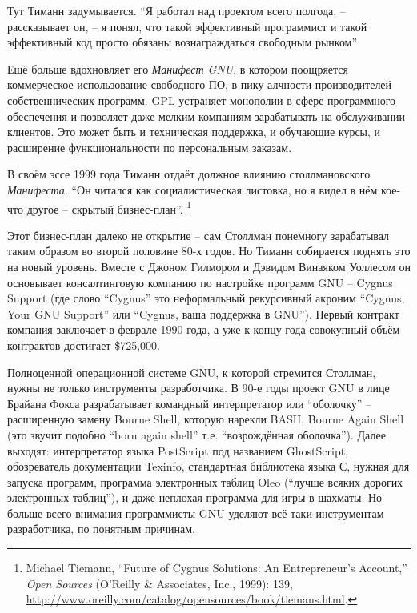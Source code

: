 Тут Тиманн задумывается. \enquote{Я работал над проектом всего полгода, -- рассказывает он, -- я понял, что такой эффективный программист и такой эффективный код просто обязаны вознаграждаться свободным рынком}

Ещё больше вдохновляет его \textit{Манифест GNU}, в котором поощряется коммерческое использование свободного ПО, в пику алчности производителей собственнических программ. GPL устраняет монополии в сфере программного обеспечения и позволяет даже мелким компаниям зарабатывать на обслуживании клиентов. Это может быть и техническая поддержка, и обучающие курсы, и расширение функциональности по персональным заказам.

В своём эссе 1999 года Тиманн отдаёт должное влиянию столлмановского \textit{Манифеста}. \enquote{Он читался как социалистическая листовка, но я видел в нём кое-что другое -- скрытый бизнес-план}. \footnote{Michael Tiemann, \enquote{Future of Cygnus Solutions: An Entrepreneur's Account,} \textit{Open Sources} (O'Reilly \& Associates, Inc., 1999): 139, \url{http://www.oreilly.com/catalog/opensources/book/tiemans.html}.}

Этот бизнес-план далеко не открытие -- сам Столлман понемногу зарабатывал таким образом во второй половине 80-х годов. Но Тиманн собирается поднять это на новый уровень. Вместе с Джоном Гилмором и Дэвидом Винаяком Уоллесом он основывает консалтинговую компанию по настройке программ GNU -- Cygnus Support (где слово \enquote{Cygnus} это неформальный рекурсивный акроним \enquote{Cygnus, Your GNU Support} или \enquote{Cygnus, ваша поддержка в GNU}). Первый контракт компания заключает в феврале 1990 года, а уже к концу года совокупный объём контрактов достигает \$725,000.

Полноценной операционной системе GNU, к которой стремится Столлман, нужны не только инструменты разработчика. В 90-е годы проект GNU в лице Брайана Фокса разрабатывает командный интерпретатор или \enquote{оболочку} -- расширенную замену Bourne Shell, которую нарекли BASH, Bourne Again Shell (это звучит подобно \enquote{born again shell} т.е. \enquote{возрождённая оболочка}). Далее выходят: интерпретатор языка PostScript под названием GhostScript, обозреватель документации Texinfo, стандартная библиотека языка С, нужная для запуска программ, программа электронных таблиц Oleo (\enquote{лучше всяких дорогих электронных таблиц}), и даже неплохая программа для игры в шахматы. Но больше всего внимания программисты GNU уделяют всё-таки инструментам разработчика, по понятным причинам.

